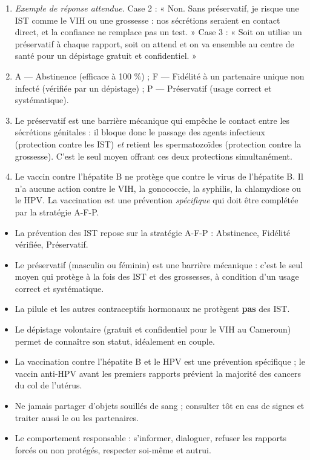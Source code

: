 \documentclass[11pt]{article}
\newcommand{\cle}[1]{{\popxbold\color{popdark}#1}}
\begin{document}
\begin{corrige}
\begin{enumerate}
\item \emph{Exemple de réponse attendue.} Case 2 : « Non. Sans préservatif, je risque une IST comme le VIH ou une grossesse : nos sécrétions seraient en contact direct, et la confiance ne remplace pas un test. » Case 3 : « Soit on utilise un préservatif à chaque rapport, soit on attend et on va ensemble au centre de santé pour un dépistage gratuit et confidentiel. »
\item A — Abstinence (efficace à 100 \%) ; F — Fidélité à un partenaire unique non infecté (vérifiée par un dépistage) ; P — Préservatif (usage correct et systématique).
\item Le préservatif est une barrière mécanique qui empêche le contact entre les sécrétions génitales : il bloque donc le passage des agents infectieux (protection contre les IST) \emph{et} retient les spermatozoïdes (protection contre la grossesse). C'est le seul moyen offrant ces deux protections simultanément.
\item Le vaccin contre l'hépatite B ne protège que contre le virus de l'hépatite B. Il n'a aucune action contre le VIH, la gonococcie, la syphilis, la chlamydiose ou le HPV. La vaccination est une prévention \emph{spécifique} qui doit être complétée par la stratégie A-F-P.
\end{enumerate}
\end{corrige}

\begin{aretenir}
\begin{itemize}
\item La prévention des IST repose sur la stratégie \cle{A-F-P} : Abstinence, Fidélité vérifiée, Préservatif.
\item Le \cle{préservatif} (masculin ou féminin) est une barrière mécanique : c'est le seul moyen qui protège à la fois des IST et des grossesses, à condition d'un usage correct et systématique.
\item La pilule et les autres contraceptifs hormonaux ne protègent \textbf{pas} des IST.
\item Le \cle{dépistage volontaire} (gratuit et confidentiel pour le VIH au Cameroun) permet de connaître son statut, idéalement en couple.
\item La \cle{vaccination} contre l'hépatite B et le HPV est une prévention spécifique ; le vaccin anti-HPV avant les premiers rapports prévient la majorité des cancers du col de l'utérus.
\item Ne jamais partager d'objets souillés de sang ; consulter tôt en cas de signes et traiter aussi le ou les partenaires.
\item Le comportement responsable : s'informer, dialoguer, refuser les rapports forcés ou non protégés, respecter soi-même et autrui.
\end{itemize}
\end{aretenir}
\end{document}
